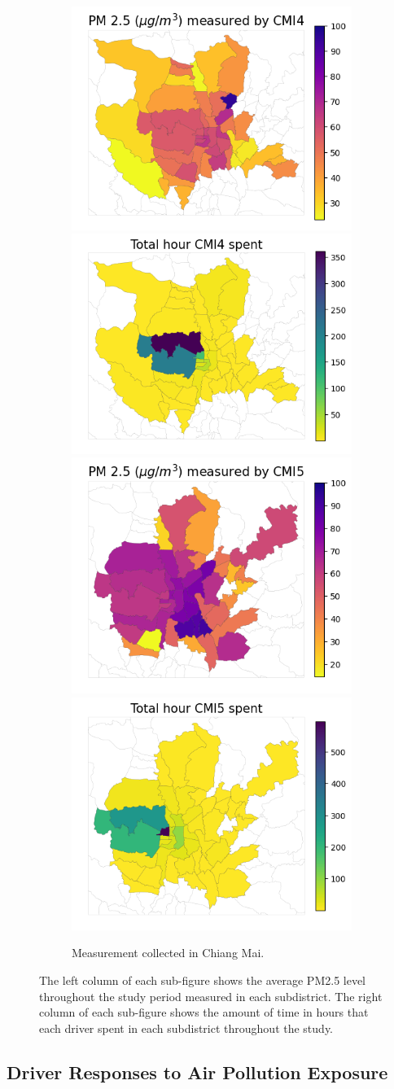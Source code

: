 \documentclass[sigconf,screen,natbib=true]{acmart}
\begin{document}
\begin{figure}
\begin{subfigure}[t]{0.49\textwidth}
        \includegraphics[width=.5\linewidth]{figures/map/CMI4_PM25.png}\includegraphics[width=.5\linewidth]{figures/map/CMI4_time.png}
        \includegraphics[width=.5\linewidth]{figures/map/CMI5_PM25.png}\includegraphics[width=.5\linewidth]{figures/map/CMI5_time.png}
        \caption{Measurement collected in Chiang Mai.}
\end{subfigure}\caption{
The left column of each sub-figure shows the average PM2.5 level throughout the study period measured in each subdistrict.
    The right column of each sub-figure shows the amount of time in hours that each driver spent in each subdistrict throughout the study.
}\Description{}
    \label{fig:subdistrict-aqi}\end{figure} \subsection{Driver Responses to Air Pollution Exposure}
\end{document}
